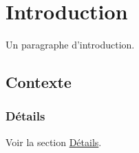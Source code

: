 \section{Introduction}\label{introduction}

Un paragraphe d'introduction.

\subsection{Contexte}\label{contexte}

\subsubsection{Détails}\label{details}

Voir la section \hyperref[details]{Détails}.
